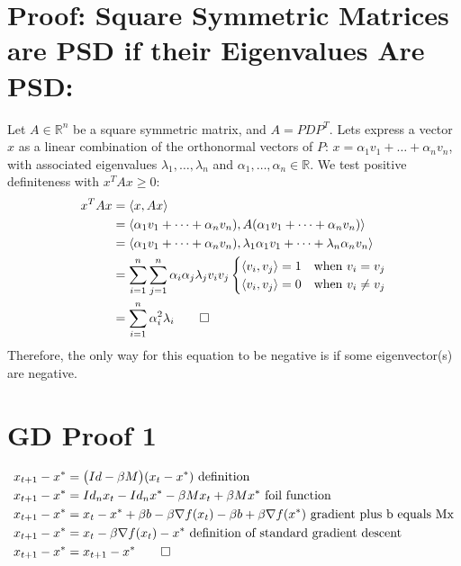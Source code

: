 \documentclass[12pt,twoside]{article}
\newcommand{\Id}{Id}
\newcommand{\R}{\mathbb{R}}
\begin{document}
\section*{Proof: Square Symmetric Matrices are PSD if their Eigenvalues Are PSD:}
Let $A \in \R^n$ be a square symmetric matrix, and $A= PDP^T$. Lets express a vector $x$ as a linear combination of the orthonormal vectors of $P$: $x=\alpha_1 v_1 + \dots + \alpha_n v_n$, with associated eigenvalues $\lambda_1, \dots, \lambda_n$ and $\alpha_1, \dots, \alpha_n \in \R$. We test positive definiteness with $x^TAx \geq 0$:
\begin{equation}
    \begin{split}
        x^TAx &= \langle x, Ax \rangle \\
        &= \langle \alpha_1 v_1 + \dots + \alpha_n v_n), A(\alpha_1 v_1 + \dots + \alpha_n v_n) \rangle\\
        &= \langle \alpha_1 v_1 + \dots + \alpha_n v_n), \lambda_1 \alpha_1 v_1 + \dots + \lambda_n \alpha_n v_n \rangle \\
        &= \sum_{i=1}^n \sum_{j=1}^n \alpha_i \alpha_j \lambda_j v_i v_j \begin{cases} \langle v_i, v_j \rangle = 1 & \text{when } v_i = v_j \\
        \langle v_i, v_j \rangle = 0 & \text{when } v_i \neq v_j\end{cases} \\
        &= \sum_{i=1}^n \alpha_i^2 \lambda_i \qed
    \end{split}
\end{equation}
Therefore, the only way for this equation to be negative is if some eigenvector(s) are negative.
\section*{GD Proof 1}
\begin{equation}
    \begin{split}
        x_{t+1} - x^* &= \big(\Id - \beta M \big)(x_t - x^*)  \text{ definition} \\
        x_{t+1} - x^* &= Id_n x_{t} - Id_nx^* - \beta Mx_{t} + \beta Mx^*  \text{ foil function} \\
        x_{t+1} - x^* &= x_{t} - x^* + \beta b - \beta\nabla f(x_t) - \beta b  + \beta\nabla f(x^*)  \text{ gradient plus b equals Mx} \\
        x_{t+1} - x^* &= x_{t} - \beta\nabla f(x_t) - x^* \text{ definition of standard gradient descent} \\
        x_{t+1} - x^* &= x_{t+1} - x^* \qed
    \end{split}
\end{equation}
\end{document}
